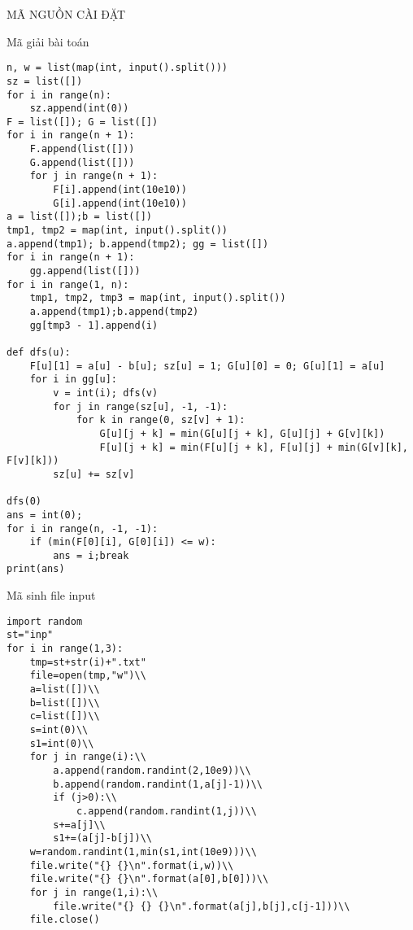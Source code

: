 \documentclass[10pt,a4paper]{article}
\begin{document}
\begin{center}
    \fontsize{30}{30}\selectfont
    MÃ NGUỒN CÀI ĐẶT
\end{center}
\fontsize{14}{20}\selectfont
Mã giải bài toán\\
\begin{lstlisting}
n, w = list(map(int, input().split()))
sz = list([])
for i in range(n):
    sz.append(int(0))
F = list([]); G = list([])
for i in range(n + 1):
    F.append(list([]))
    G.append(list([]))
    for j in range(n + 1):
        F[i].append(int(10e10))
        G[i].append(int(10e10))
a = list([]);b = list([])
tmp1, tmp2 = map(int, input().split())
a.append(tmp1); b.append(tmp2); gg = list([])
for i in range(n + 1):
    gg.append(list([]))
for i in range(1, n):
    tmp1, tmp2, tmp3 = map(int, input().split())
    a.append(tmp1);b.append(tmp2)
    gg[tmp3 - 1].append(i)

def dfs(u):
    F[u][1] = a[u] - b[u]; sz[u] = 1; G[u][0] = 0; G[u][1] = a[u]
    for i in gg[u]:
        v = int(i); dfs(v)
        for j in range(sz[u], -1, -1):
            for k in range(0, sz[v] + 1):
                G[u][j + k] = min(G[u][j + k], G[u][j] + G[v][k])
                F[u][j + k] = min(F[u][j + k], F[u][j] + min(G[v][k], F[v][k]))
        sz[u] += sz[v]

dfs(0)
ans = int(0);
for i in range(n, -1, -1):
    if (min(F[0][i], G[0][i]) <= w):
        ans = i;break
print(ans)
\end{lstlisting}
\vspace{2 cm}
Mã sinh file input\\
\begin{lstlisting}
import random
st="inp"
for i in range(1,3):
    tmp=st+str(i)+".txt"
    file=open(tmp,"w")\\
    a=list([])\\
    b=list([])\\
    c=list([])\\
    s=int(0)\\
    s1=int(0)\\
    for j in range(i):\\
        a.append(random.randint(2,10e9))\\
        b.append(random.randint(1,a[j]-1))\\
        if (j>0):\\
            c.append(random.randint(1,j))\\
        s+=a[j]\\
        s1+=(a[j]-b[j])\\
    w=random.randint(1,min(s1,int(10e9)))\\
    file.write("{} {}\n".format(i,w))\\
    file.write("{} {}\n".format(a[0],b[0]))\\
    for j in range(1,i):\\
        file.write("{} {} {}\n".format(a[j],b[j],c[j-1]))\\
    file.close()
\end{lstlisting}
\end{document}
